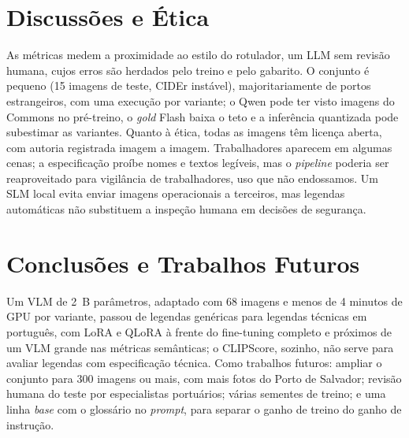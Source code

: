 \documentclass[12pt]{article}
\begin{document}
\section{Discussões e Ética}

As métricas medem a proximidade ao estilo do rotulador, um LLM sem revisão
humana, cujos erros são herdados pelo treino e pelo gabarito. O conjunto é
pequeno (15 imagens de teste, CIDEr instável), majoritariamente de portos
estrangeiros, com uma execução por variante; o Qwen pode ter visto imagens
do Commons no pré-treino, o \textit{gold} Flash baixa o teto e a inferência
quantizada pode subestimar as variantes. Quanto à ética, todas as imagens
têm licença aberta, com autoria registrada imagem a imagem. Trabalhadores
aparecem em algumas cenas; a especificação proíbe nomes e textos legíveis,
mas o \textit{pipeline} poderia ser reaproveitado para vigilância de
trabalhadores, uso que não endossamos. Um SLM local evita enviar imagens
operacionais a terceiros, mas legendas automáticas não substituem a inspeção humana em decisões de segurança.

\section{Conclusões e Trabalhos Futuros}

Um VLM de 2~B parâmetros, adaptado com 68 imagens e menos de 4 minutos de GPU
por variante, passou de legendas genéricas para legendas técnicas em
português, com LoRA e QLoRA à frente do fine-tuning completo e próximos de
um VLM grande nas métricas semânticas; o CLIPScore, sozinho, não serve para
avaliar legendas com especificação técnica. Como trabalhos futuros: ampliar
o conjunto para 300 imagens ou mais, com mais fotos do Porto de Salvador;
revisão humana do teste por especialistas portuários; várias sementes de
treino; e uma linha \textit{base} com o glossário no \textit{prompt}, para
separar o ganho de treino do ganho de instrução.


\end{document}

